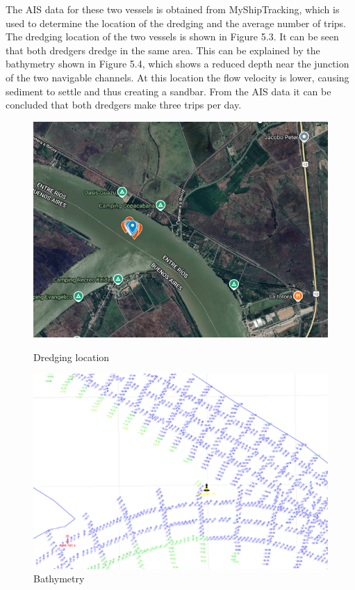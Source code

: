 The AIS data for these two vessels is obtained from MyShipTracking, which is used to determine the location of the dredging and the average number of trips. The dredging location of the two vessels is shown in Figure 5.3. It can be seen that both dredgers dredge in the same area. This can be explained by the bathymetry shown in Figure 5.4, which shows a reduced depth near the junction of the two navigable channels. At this location the flow velocity is lower, causing sediment to settle and thus creating a sandbar. From the AIS data it can be concluded that both dredgers make three trips per day.

\begin{figure}[H]
    \centering
    \begin{minipage}{0.48\textwidth}
        \centering
        \includegraphics[width=\linewidth]{figures/ch5/Dredging_coordinates.png}
        \caption{Dredging location}
        \label{fig:dredging_coordinates}
    \end{minipage}\hfill
    \begin{minipage}{0.48\textwidth}
        \centering
        \includegraphics[width=\linewidth]{figures/ch5/Bathymetry.png}
        \caption{Bathymetry}
        \label{fig:bathymetry}
    \end{minipage}
\end{figure}


